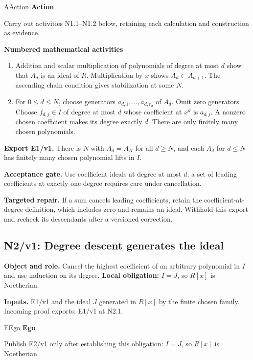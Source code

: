 \documentclass[preprint,12pt,aps,pra,showkeys,amsmath,amssymb,superscriptaddress,floatfix]{revtex4-2}
\theoremstyle{definition}
\theoremstyle{remark}
\newcommand{\mmfaculty}[3]{%
 \begin{mmfacultybox}{#1}{#2}
 {\sffamily\bfseries\color{MMBlue}#2}\par\smallskip #3
 \end{mmfacultybox}}
\newcommand{\field}[2]{\par\smallskip\noindent\textbf{#1.} #2\par}
\begin{document}
\mmfaculty{A}{Action}{Carry out activities N1.1--N1.2 below, retaining each calculation and
construction as evidence.}

\smallskip\noindent\textbf{Numbered mathematical activities}

\begin{enumerate}[label=N1.\arabic*,leftmargin=3.4em]

\item Addition and scalar multiplication of polynomials of degree at most
\(d\) show that \(A_d\) is an ideal of \(R\). Multiplication by \(x\)
shows \(A_d\subset A_{d+1}\). The ascending chain condition gives
stabilization at some \(N\).

\item For \(0\le d\le N\), choose generators \(a_{d,1},\ldots,a_{d,r_d}\) of
\(A_d\). Omit zero generators. Choose \(f_{d,j}\in I\) of degree at most
\(d\) whose coefficient at \(x^d\) is \(a_{d,j}\). A nonzero chosen
coefficient makes its degree exactly \(d\). There are only finitely many
chosen polynomials.

\end{enumerate}

\field{Export E1/v1}{There is \(N\) with \(A_d=A_N\) for all \(d\ge N\), and each \(A_d\) for
\(d\le N\) has finitely many chosen polynomial lifts in \(I\).}

\field{Acceptance gate}{Use coefficient ideals at degree at most \(d\); a set of leading
coefficients at exactly one degree requires care under cancellation.}

\field{Targeted repair}{If a sum cancels leading coefficients, retain the coefficient-at-degree
definition, which includes zero and remains an ideal. Withhold this
export and recheck its descendants after a versioned correction.}

\clearpage

\subsection{N2/v1: Degree descent generates the ideal}

\field{Object and role}{Cancel the highest coefficient of an arbitrary polynomial in \(I\) and
use induction on its degree. \textbf{Local obligation:} \(I=J\), so
\(R[x]\) is Noetherian.}

\field{Inputs}{E1/v1 and the ideal \(J\) generated in \(R[x]\) by the finite chosen
family. Incoming proof exports: E1/v1 at N2.1.}

\mmfaculty{E}{Ego}{Publish E2/v1 only after establishing this obligation: \(I=J\), so
\(R[x]\) is Noetherian.}
\end{document}
